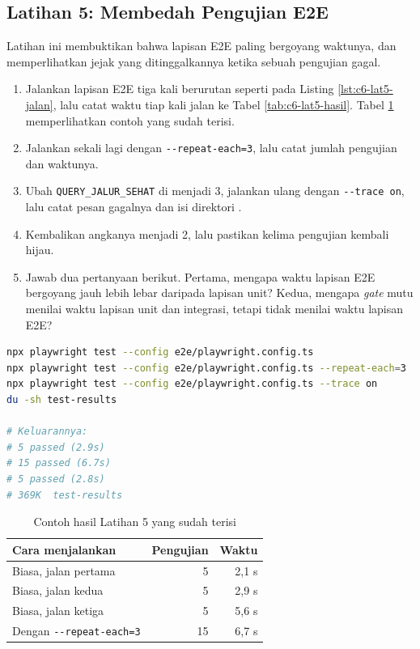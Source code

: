 \subsection*{Latihan 5: Membedah Pengujian E2E}

Latihan ini membuktikan bahwa lapisan E2E paling bergoyang waktunya, dan
memperlihatkan jejak yang ditinggalkannya ketika sebuah pengujian gagal.

\begin{enumerate}
  \item Jalankan lapisan E2E tiga kali berurutan seperti pada Listing
        \ref{lst:c6-lat5-jalan}, lalu catat waktu tiap kali jalan ke Tabel \ref{tab:c6-lat5-hasil}. Tabel \ref{tab:c6-lat5-contoh}
        memperlihatkan contoh yang sudah terisi.
  \item Jalankan sekali lagi dengan \texttt{-{}-repeat-each=3}, lalu catat
        jumlah pengujian dan waktunya.
  \item Ubah \texttt{QUERY\_JALUR\_SEHAT} di 
        menjadi 3, jalankan ulang dengan \texttt{-{}-trace on}, lalu catat
        pesan gagalnya dan isi direktori .
  \item Kembalikan angkanya menjadi 2, lalu pastikan kelima pengujian kembali
        hijau.
  \item Jawab dua pertanyaan berikut. Pertama, mengapa waktu lapisan E2E
        bergoyang jauh lebih lebar daripada lapisan unit? Kedua, mengapa
        \textit{gate} mutu menilai waktu lapisan unit dan integrasi, tetapi
        tidak menilai waktu lapisan E2E?
\end{enumerate}

\begin{lstlisting}[language=bash, caption={Menjalankan lapisan E2E berulang kali beserta jejaknya, memakai \berkas{sources/chapter06/e2e/playwright.config.ts}}, label={lst:c6-lat5-jalan}]
npx playwright test --config e2e/playwright.config.ts
npx playwright test --config e2e/playwright.config.ts --repeat-each=3
npx playwright test --config e2e/playwright.config.ts --trace on
du -sh test-results

# Keluarannya:
# 5 passed (2.9s)
# 15 passed (6.7s)
# 5 passed (2.8s)
# 369K  test-results
\end{lstlisting}

\begin{table}[!htb]
  \centering
  \caption{Contoh hasil Latihan 5 yang sudah terisi}
  \label{tab:c6-lat5-contoh}
  \begin{tabularx}{\textwidth}{Xrr}
    \hline
    \textbf{Cara menjalankan} & \textbf{Pengujian} & \textbf{Waktu} \\
    \hline
    Biasa, jalan pertama & 5 & 2,1 s \\
    \hline
    Biasa, jalan kedua & 5 & 2,9 s \\
    \hline
    Biasa, jalan ketiga & 5 & 5,6 s \\
    \hline
    Dengan \texttt{-{}-repeat-each=3} & 15 & 6,7 s \\
    \hline
  \end{tabularx}
\end{table}

